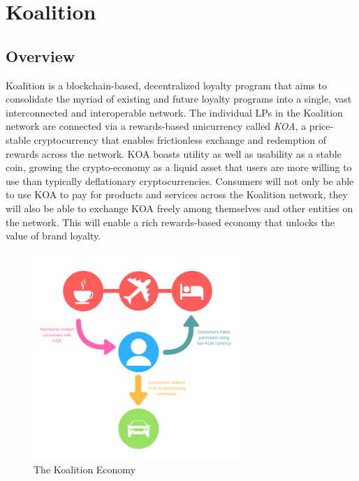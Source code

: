 \section{Koalition}
\subsection{Overview}
Koalition is a blockchain-based, decentralized loyalty program that aims to consolidate the myriad of existing and future loyalty programs into a single, vast interconnected and interoperable network. The individual LPs in the Koalition network are connected via a rewards-based unicurrency called \textit{KOA}, a price-stable cryptocurrency that enables frictionless exchange and redemption of rewards across the network. KOA boasts utility as well as usability as a stable coin, growing the crypto-economy as a liquid asset that users are more willing to use than typically deflationary cryptocurrencies. Consumers will not only be able to use KOA to pay for products and services across the Koalition network, they will also be able to exchange KOA freely among themselves and other entities on the network. This will enable a rich rewards-based economy that unlocks the value of brand loyalty.
%
\begin{figure}[h] %
    \centering
        \includegraphics[keepaspectratio, width=0.7\textwidth]{images/KOAeconomy.png}
    \caption{The Koalition Economy} \label{fig:KOAeconomy}
\end{figure}

